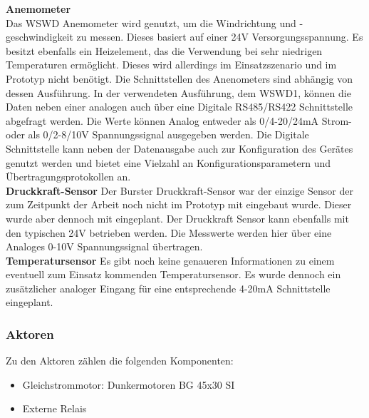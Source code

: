 \noindent\textbf{Anemometer}\\
Das WSWD Anemometer wird genutzt, um die Windrichtung und -geschwindigkeit zu messen. Dieses basiert auf einer 24V Versorgungsspannung. Es besitzt ebenfalls ein Heizelement, das die Verwendung bei sehr niedrigen Temperaturen ermöglicht. Dieses wird allerdings im Einsatzszenario und im Prototyp nicht benötigt. Die Schnittstellen des Anenometers sind abhängig von dessen Ausführung. In der verwendeten Ausführung, dem WSWD1, können die Daten neben einer analogen auch über eine Digitale RS485/RS422 Schnittstelle abgefragt werden. Die Werte können Analog entweder als 0/4-20/24mA Strom- oder als 0/2-8/10V Spannungssignal ausgegeben werden. Die Digitale Schnittstelle kann neben der Datenausgabe auch zur Konfiguration des Gerätes genutzt werden und bietet eine Vielzahl an Konfigurationsparametern und Übertragungsprotokollen an.\\

\noindent\textbf{Druckkraft-Sensor}\newline
Der Burster Druckkraft-Sensor war der einzige Sensor der zum Zeitpunkt der Arbeit noch nicht im Prototyp mit eingebaut wurde. Dieser wurde aber dennoch mit eingeplant. Der Druckkraft Sensor kann ebenfalls mit den typischen 24V betrieben werden. Die Messwerte werden hier über eine Analoges 0-10V Spannungssignal übertragen.\\

\noindent\textbf{Temperatursensor}\newline
Es gibt noch keine genaueren Informationen zu einem eventuell zum Einsatz kommenden Temperatursensor. Es wurde dennoch ein zusätzlicher analoger Eingang für eine entsprechende 4-20mA Schnittstelle eingeplant.\\
\subsubsection{Aktoren}
Zu den Aktoren zählen die folgenden Komponenten:
\begin{itemize}
	\item Gleichstrommotor: Dunkermotoren BG 45x30 SI
	\item Externe Relais
\end{itemize}

